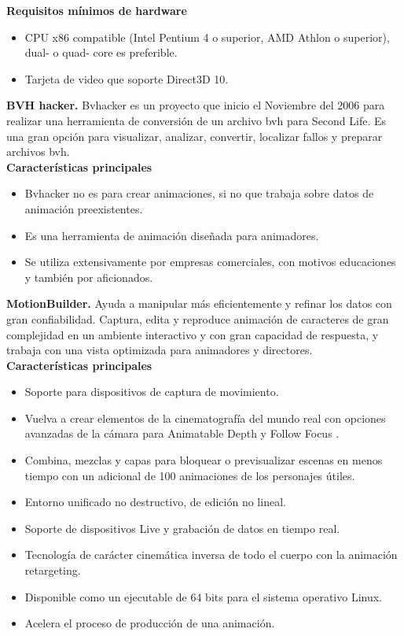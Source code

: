 \textbf{Requisitos mínimos de hardware}

\begin{itemize} \itemsep1pt \parskip0pt 
	\item CPU x86 compatible (Intel Pentium 4 o superior, AMD Athlon o superior), dual- o quad- core es preferible.
	\item Tarjeta de video que soporte Direct3D 10.
\end{itemize}

\textbf{BVH hacker.} Bvhacker es un proyecto que inicio el Noviembre del 2006 para realizar una herramienta de conversión de un archivo bvh para Second Life. Es una gran opción para visualizar, analizar, convertir, localizar fallos y preparar archivos bvh. \cite{BVHacker}\\

\textbf{Características principales}

\begin{itemize} \itemsep1pt \parskip0pt 
	\item Bvhacker no es para crear animaciones, si no que trabaja sobre datos de animación preexistentes.
	\item Es una herramienta de animación diseñada para animadores.
	\item Se utiliza extensivamente por empresas comerciales, con motivos educaciones y también por aficionados.
\end{itemize}

\textbf{MotionBuilder.} Ayuda a manipular más eficientemente y refinar los datos con gran confiabilidad. Captura, edita y reproduce animación de caracteres de gran complejidad en un ambiente interactivo y con gran capacidad de respuesta, y trabaja con una vista optimizada para animadores y directores.  \cite{MotionBuilder}\\

\textbf{Características principales}

\begin{itemize} \itemsep1pt \parskip0pt 
	\item Soporte para dispositivos de captura de movimiento.
	\item Vuelva a crear elementos de la cinematografía del mundo real con opciones avanzadas de la cámara para Animatable Depth y Follow Focus .
	\item Combina, mezclas y capas para bloquear o previsualizar escenas en menos tiempo con un adicional de 100 animaciones de los personajes útiles.
	\item Entorno unificado no destructivo, de edición no lineal.
	\item Soporte de dispositivos Live y grabación de datos en tiempo real.
	\item Tecnología de carácter cinemática inversa de todo el cuerpo con la animación retargeting.
	\item Disponible como un ejecutable de 64 bits para el sistema operativo Linux.
	\item Acelera el proceso de producción de una animación.
\end{itemize}



